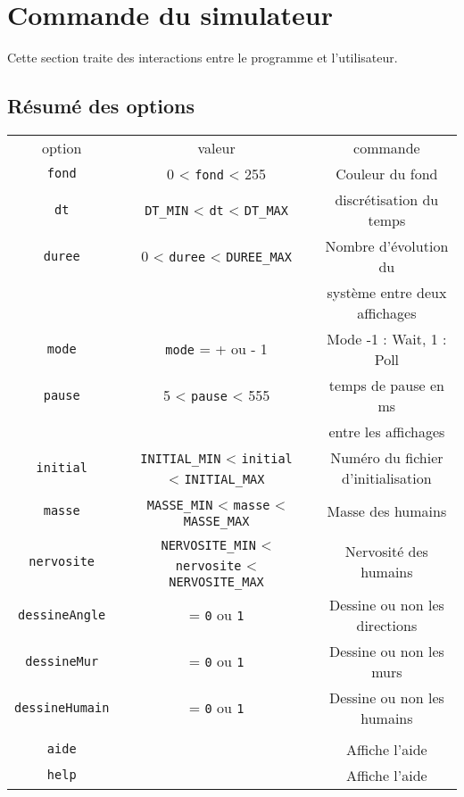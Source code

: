 \section{Commande du simulateur}
%
Cette section traite des interactions entre le programme et l'utilisateur.
%
\subsection{Résumé des options}
\begin{center}
\begin{tabular}{ccccc}
option & & valeur &  & commande \\
\texttt{fond} &  & 0 < \texttt{fond} < 255 &  & Couleur du fond \\
\texttt{dt} &  & \texttt{DT\_MIN} < \texttt{dt} < \texttt{DT\_MAX} &  & discrétisation du temps \\
\texttt{duree} &  & 0 < \texttt{duree} < \texttt{DUREE\_MAX} &  & Nombre d'évolution du \\
 &  &  &  & système entre deux affichages \\
\texttt{mode} &  & \texttt{mode} = + ou - 1 &  & Mode -1 : Wait, 1 : Poll \\
\texttt{pause} &  & 5 < \texttt{pause} < 555 &  & temps de pause en ms \\
 &  &  &  & entre les affichages \\
\texttt{initial} &  & \texttt{INITIAL\_MIN} < \texttt{initial} < \texttt{INITIAL\_MAX} &  & Numéro du fichier d'initialisation \\
\texttt{masse} &  & \texttt{MASSE\_MIN} < \texttt{masse} < \texttt{MASSE\_MAX} &  & Masse des humains \\
\texttt{nervosite} &  & \texttt{NERVOSITE\_MIN} < \texttt{nervosite} < \texttt{NERVOSITE\_MAX} &  & Nervosité des humains \\%
\texttt{dessineAngle} &  & = \texttt{0} ou \texttt{1} &  & Dessine ou non les directions \\
\texttt{dessineMur} &  & = \texttt{0} ou \texttt{1} &  & Dessine ou non les murs \\
\texttt{dessineHumain} &  & = \texttt{0} ou \texttt{1} &  & Dessine ou non les humains \\

\\
\texttt{aide} &  &  &  & Affiche l'aide \\
\texttt{help} &  &  &  & Affiche l'aide \\
\end{tabular}
\end{center}
%
